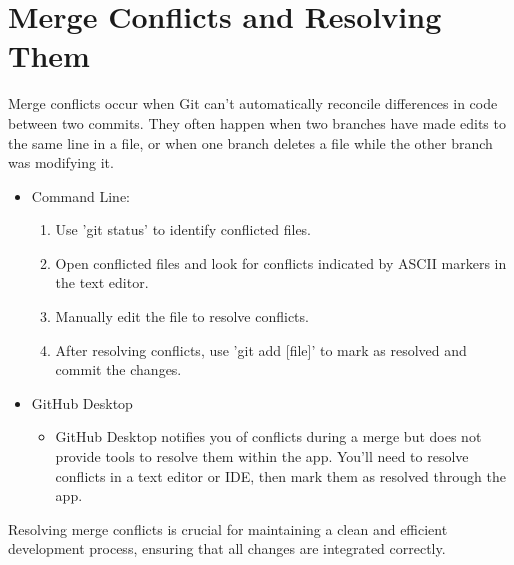 \documentclass[10pt,twocolumn]{article}
\begin{document}
\section{Merge Conflicts and Resolving Them}

Merge conflicts occur when Git can't automatically reconcile differences in code between two commits. They often happen when two branches have made edits to the same line in a file, or when one branch deletes a file while the other branch was modifying it.
\begin{itemize}
    \item Command Line: 
    \begin{enumerate}
        \item Use 'git status' to identify conflicted files.
        \item Open conflicted files and look for conflicts indicated by ASCII markers in the text editor.
        \item Manually edit the file to resolve conflicts.
        \item After resolving conflicts, use 'git add [file]' to mark as resolved and commit the changes.
    \end{enumerate}
    \item GitHub Desktop
    \begin{itemize}
        \item GitHub Desktop notifies you of conflicts during a merge but does not provide tools to resolve them within the app. You'll need to resolve conflicts in a text editor or IDE, then mark them as resolved through the app.
    \end{itemize}
    
\end{itemize}

Resolving merge conflicts is crucial for maintaining a clean and efficient development process, ensuring that all changes are integrated correctly.

\printbibliography
\end{document}
